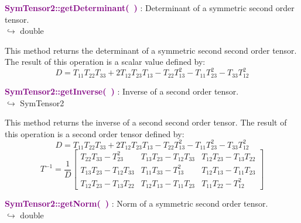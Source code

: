 \textcolor{purple}{\textbf{SymTensor2::getDeterminant(~)}}\label{SymTensor2::getDeterminant()} : Determinant of a symmetric second order tensor.\\ \hspace*{5mm}$\hookrightarrow$ double

This method returns the determinant of a symmetric second second order tensor.
The result of this operation is a scalar value defined by:
\begin{equation*}
D = T_{11} T_{22} T_{33} + 2 T_{12} T_{23} T_{13} - T_{22} T_{13}^2 - T_{11} T_{23}^2 - T_{33} T_{12}^2
\end{equation*}

\textcolor{purple}{\textbf{SymTensor2::getInverse(~)}}\label{SymTensor2::getInverse()} : Inverse of a second order tensor.\\ \hspace*{5mm}$\hookrightarrow$ SymTensor2

This method returns the inverse of a second second order tensor.
The result of this operation is a second order tensor defined by:
\begin{equation*}
D = T_{11} T_{22} T_{33} + 2 T_{12} T_{23} T_{13} - T_{22} T_{13}^2 - T_{11} T_{23}^2 - T_{33} T_{12}^2
\end{equation*}
\begin{equation*}
T^{-1} = \frac {1}{D} \left[\begin{array}{ccc}
  T_{22}T_{33}-T_{23}^2&T_{13}T_{23}-T_{12}T_{33}&T_{12}T_{23}-T_{13}T_{22}\\
  T_{13}T_{23}-T_{12}T_{33}&T_{11}T_{33}-T_{13}^2&T_{12}T_{13}-T_{11}T_{23}\\
  T_{12}T_{23}-T_{13}T_{22}&T_{12}T_{13}-T_{11}T_{23}&T_{11}T_{22}-T_{12}^2
  \end{array}
  \right]
\end{equation*}

\textcolor{purple}{\textbf{SymTensor2::getNorm(~)}}\label{SymTensor2::getNorm()} : Norm of a symmetric second order tensor.\\ \hspace*{5mm}$\hookrightarrow$ double

